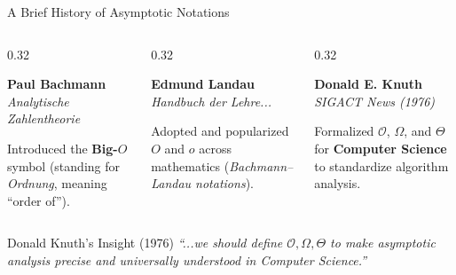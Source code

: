 \documentclass[aspectratio=169]{beamer}
\begin{document}
\begin{frame}{A Brief History of Asymptotic Notations}
  \begin{columns}[T]
    \begin{column}{0.32\textwidth}
      \begin{tcolorbox}[colframe=ForestGreen,colback=SoftGreen!30,title={\centering\bfseries 1894: Bachmann},arc=2mm]
        \scriptsize
        \textbf{Paul Bachmann}\\
        \textit{Analytische Zahlentheorie}
        \vspace{0.4em}
        
        Introduced the \textbf{Big-$O$} symbol (standing for \textit{Ordnung}, meaning ``order of'').
      \end{tcolorbox}
    \end{column}
    \begin{column}{0.32\textwidth}
      \begin{tcolorbox}[colframe=blue!60!black,colback=SoftBlue!30,title={\centering\bfseries 1909: Landau},arc=2mm]
        \scriptsize
        \textbf{Edmund Landau}\\
        \textit{Handbuch der Lehre...}
        \vspace{0.4em}
        
        Adopted and popularized $O$ and $o$ across mathematics (\textit{Bachmann--Landau notations}).
      \end{tcolorbox}
    \end{column}
    \begin{column}{0.32\textwidth}
      \begin{tcolorbox}[colframe=orange!75!black,colback=SoftOrange!30,title={\centering\bfseries 1976: Knuth},arc=2mm]
        \scriptsize
        \textbf{Donald E. Knuth}\\
        \textit{SIGACT News (1976)}
        \vspace{0.4em}
        
        Formalized $\mathcal{O}$, $\Omega$, and $\Theta$ for \textbf{Computer Science} to standardize algorithm analysis.
      \end{tcolorbox}
    \end{column}
  \end{columns}
  \vspace{0.6em}
  \begin{alertblock}{Donald Knuth's Insight (1976)}
    \centering\small
    \textit{``...we should define $\mathcal{O}, \Omega, \Theta$ to make asymptotic analysis precise and universally understood in Computer Science.''}
  \end{alertblock}
\end{frame}
\end{document}
